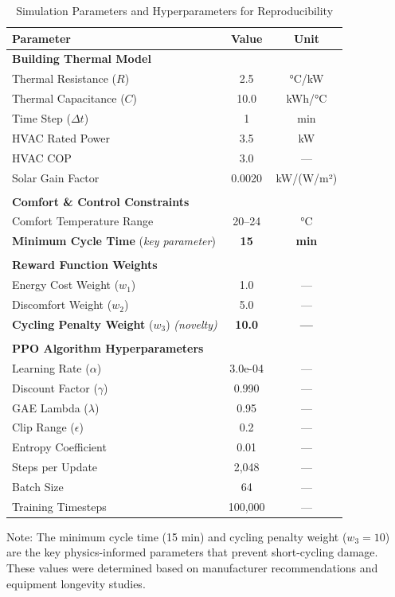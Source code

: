 
\begin{table}[ht]
\centering
\caption{Simulation Parameters and Hyperparameters for Reproducibility}
\label{tab:parameters}
\begin{tabular}{lcc}
\toprule
\textbf{Parameter} & \textbf{Value} & \textbf{Unit} \\
\midrule
\textbf{Building Thermal Model} &  &  \\
Thermal Resistance ($R$) & 2.5 & °C/kW \\
Thermal Capacitance ($C$) & 10.0 & kWh/°C \\
Time Step ($\Delta t$) & 1 & min \\
HVAC Rated Power & 3.5 & kW \\
HVAC COP & 3.0 & — \\
Solar Gain Factor & 0.0020 & kW/(W/m²) \\
 &  &  \\
\textbf{Comfort \& Control Constraints} &  &  \\
Comfort Temperature Range & 20–24 & °C \\
\textbf{Minimum Cycle Time} (\textit{key parameter}) & \textbf{15} & \textbf{{min}} \\
 &  &  \\
\textbf{Reward Function Weights} &  &  \\
Energy Cost Weight ($w_1$) & 1.0 & — \\
Discomfort Weight ($w_2$) & 5.0 & — \\
\textbf{Cycling Penalty Weight} ($w_3$) \textit{(novelty)} & \textbf{10.0} & \textbf{{—}} \\
 &  &  \\
\textbf{PPO Algorithm Hyperparameters} &  &  \\
Learning Rate ($\alpha$) & 3.0e-04 & — \\
Discount Factor ($\gamma$) & 0.990 & — \\
GAE Lambda ($\lambda$) & 0.95 & — \\
Clip Range ($\epsilon$) & 0.2 & — \\
Entropy Coefficient & 0.01 & — \\
Steps per Update & 2,048 & — \\
Batch Size & 64 & — \\
Training Timesteps & 100,000 & — \\
\bottomrule
\end{tabular}
\begin{tablenotes}
\small
\item Note: The minimum cycle time (15 min) and cycling penalty weight ($w_3=10$) are the key physics-informed parameters that prevent short-cycling damage. These values were determined based on manufacturer recommendations and equipment longevity studies.
\end{tablenotes}
\end{table}
